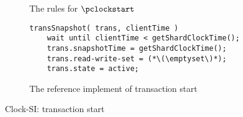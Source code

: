 \begin{figure}
\begin{subfigure}{\textwidth}
\begin{mathpar}
\end{mathpar}

\caption{The rules for \( \pclockstart \)}
\label{}
\end{subfigure}

\hrulefill

\begin{subfigure}{\textwidth}
\begin{lstlisting}
transSnapshot( trans, clientTime )
    wait until clientTime < getShardClockTime();
    trans.snapshotTime = getShardClockTime();
    trans.read-write-set = (*\(\emptyset\)*);
    trans.state = active;
\end{lstlisting}

\caption{The reference implement of transaction start}
\label{lst:clock-si-trans-runtime}
\end{subfigure}

\hrulefill

\caption{Clock-SI: transaction start}
\label{fig:clock-si-transaction-start}
\end{figure}
